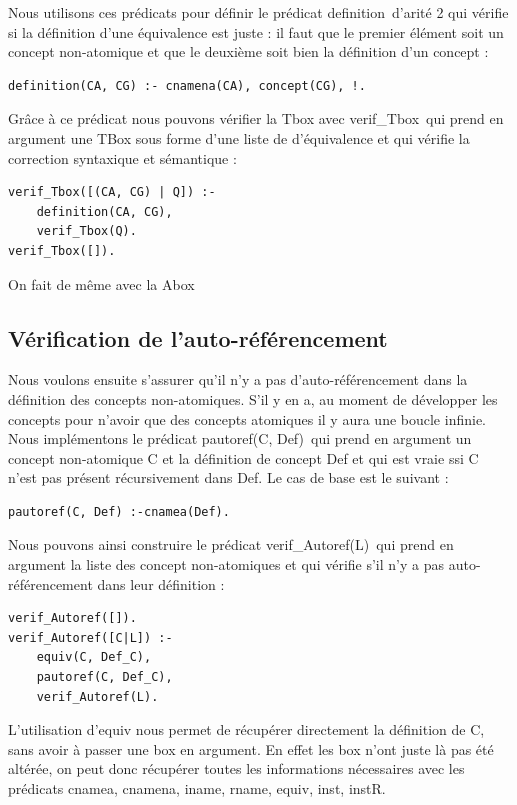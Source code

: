 \documentclass{article}
\begin{document}
Nous utilisons ces prédicats pour définir le prédicat \color{blue}definition\color{black}\ d'arité 2 qui vérifie si la définition d'une équivalence est juste : il faut que le premier élément soit un concept non-atomique et que le deuxième soit bien la définition d'un concept :
\begin{verbatim}
definition(CA, CG) :- cnamena(CA), concept(CG), !.
\end{verbatim}

Grâce à ce prédicat nous pouvons vérifier la Tbox avec \color{blue}verif\_Tbox\color{black}\ qui prend en argument une TBox sous forme d'une liste de d'équivalence et qui vérifie la correction syntaxique et sémantique : 
\begin{verbatim}
verif_Tbox([(CA, CG) | Q]) :- 
    definition(CA, CG), 
    verif_Tbox(Q).
verif_Tbox([]).
\end{verbatim}
On fait de même avec la Abox
\subsection{Vérification de l'auto-référencement}
Nous voulons ensuite s'assurer qu'il n'y a pas d'auto-référencement dans la définition des concepts non-atomiques. S'il y en a, au moment de développer les concepts pour n'avoir que des concepts atomiques il y aura une boucle infinie. Nous implémentons le prédicat \color{blue}pautoref(C, Def)\color{black}\ qui prend en argument un concept non-atomique C et la définition de concept Def et qui est vraie ssi C n'est pas présent récursivement dans Def. Le cas de base est le suivant :
\begin{verbatim}
pautoref(C, Def) :-cnamea(Def).
\end{verbatim}

Nous pouvons ainsi construire le prédicat \color{blue}verif\_Autoref(L)\color{black}\ qui prend en argument la liste des concept non-atomiques et qui vérifie s'il n'y a pas auto-référencement dans leur définition : 
\begin{verbatim}
verif_Autoref([]).
verif_Autoref([C|L]) :-
	equiv(C, Def_C),
	pautoref(C, Def_C),
	verif_Autoref(L).
\end{verbatim}
L'utilisation d'equiv nous permet de récupérer directement la définition de C, sans avoir à passer une box en argument. En effet les box n'ont juste là pas été altérée, on peut donc récupérer toutes les informations nécessaires avec les prédicats  \color{blue}cnamea, cnamena, iname, rname, equiv, inst, instR\color{black}.
\end{document}
